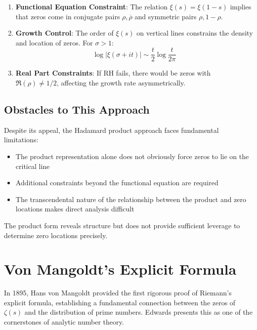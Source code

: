 \begin{enumerate}
\item \textbf{Functional Equation Constraint}: The relation $\xi(s) = \xi(1-s)$ implies that zeros come in conjugate pairs $\rho, \overline{\rho}$ and symmetric pairs $\rho, 1-\rho$.

\item \textbf{Growth Control}: The order of $\xi(s)$ on vertical lines constrains the density and location of zeros. For $\sigma > 1$:
\begin{equation}
\log|\xi(\sigma + it)| \sim \frac{t}{2}\log\frac{t}{2\pi}
\end{equation}

\item \textbf{Real Part Constraints}: If RH fails, there would be zeros with $\Re(\rho) \neq 1/2$, affecting the growth rate asymmetrically.
\end{enumerate}

\subsection{Obstacles to This Approach}

Despite its appeal, the Hadamard product approach faces fundamental limitations:

\begin{remark}
\begin{itemize}
\item The product representation alone does not obviously force zeros to lie on the critical line
\item Additional constraints beyond the functional equation are required
\item The transcendental nature of the relationship between the product and zero locations makes direct analysis difficult
\end{itemize}
\end{remark}

The product form reveals structure but does not provide sufficient leverage to determine zero locations precisely.

\section{Von Mangoldt's Explicit Formula}

In 1895, Hans von Mangoldt provided the first rigorous proof of Riemann's explicit formula, establishing a fundamental connection between the zeros of $\zeta(s)$ and the distribution of prime numbers. Edwards \cite{edwards1974} presents this as one of the cornerstones of analytic number theory.


